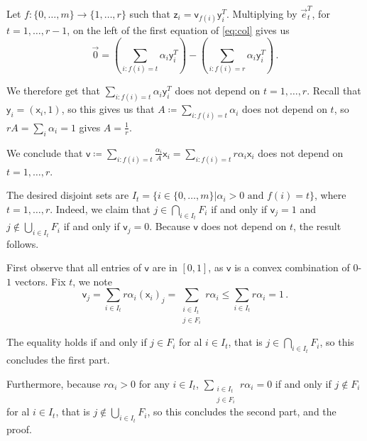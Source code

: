 \documentclass[kulak]{tplt}
\theoremstyle{definition}
\newcommand{\vv}{\mathsf{v}}
\newcommand{\vx}{\mathsf{x}}
\newcommand{\vy}{\mathsf{y}}
\newcommand{\vz}{\mathsf{z}}
\begin{document}
\begin{enumerate}
Let $f:\{0, \ldots, m\} \to \{1, \ldots, r\}$ such that $\vz_i = \vv_{f(i)}\vy_i^T$.
Multiplying by $\vec{e}_t^T$, for $t = 1, \ldots, r-1$, on the left of the first equation of \eqref{eq:col} gives us 
$$ \vec{0} = \left( \sum_{i: f(i) = t} \alpha_i \vy_i^T\right) - \left(\sum_{i: f(i) = r} \alpha_i \vy_i^T \right) \, . $$

We therefore get that $ \sum_{i: f(i) = t} \alpha_i \vy_i^T$ does not depend on $t = 1, \ldots, r$.
Recall that $\vy_i = (\vx_i, 1)$, so this gives us that $A \coloneqq  \sum_{i: f(i) = t} \alpha_i$ does not depend on $t$, so $r A = \sum_i \alpha_i = 1$ gives $A = \frac{1}{r}$.

We conclude that $\vv \coloneqq  \sum_{i: f(i) = t} \frac{\alpha_i}{A}\vx_i = \sum_{i: f(i) = t} r \alpha_i\vx_i$ does not depend on $t=1, \ldots, r$.

The desired disjoint sets are $I_t = \{ i \in \{0, \ldots, m\} | \alpha_i > 0 \text{ and } f(i) = t \}$, where $t = 1, \ldots, r$.
Indeed, we claim that $j \in \bigcap_{i \in I_t} F_i$ if and only if $\vv_j = 1$ and $j \not\in \bigcup_{i \in I_t} F_i$ if and only if $\vv_j = 0$.
Because $\vv $ does not depend on $t$, the result follows.

First observe that all entries of $\vv$ are in $[0, 1]$, as $\vv$ is a convex combination of $0$-$1$ vectors.
Fix $t$, we note
$$\vv_j = \sum_{i \in I_t} r \alpha_i(\vx_i)_j = \sum_{\substack{i \in I_t\\ j \in F_i}} r \alpha_i \leq \sum_{i \in I_t} r \alpha_i = 1  \, .$$

The equality holds if and only if $j \in F_i$ for al $i\in I_t$, that is $j \in \bigcap_{i \in I_t} F_i$, so this concludes the first part.

Furthermore, because $r \alpha_i > 0$ for any $i\in I_t$, $\sum_{\substack{i \in I_t\\ j \in F_i}} r \alpha_i  = 0 $ if and only if $j \not\in F_i$ for al $i\in I_t$, that is $j \not\in \bigcup_{i \in I_t} F_i$, so this concludes the second part, and the proof.
\end{enumerate}
\end{document}
